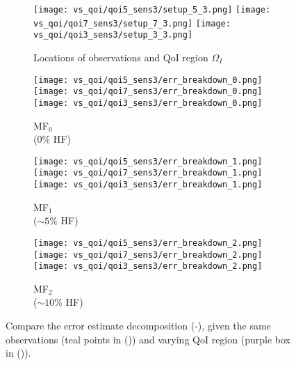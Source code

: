\begin{figure}[h]
\captionsetup[subfigure]{justification=centering}
\centering
  \begin{subfigure}[t]{0.20\textwidth}
  \centering
    \texttt{[image: vs\_qoi/qoi5\_sens3/setup\_5\_3.png]}
    \texttt{[image: vs\_qoi/qoi7\_sens3/setup\_7\_3.png]}
    \texttt{[image: vs\_qoi/qoi3\_sens3/setup\_3\_3.png]}
    \caption{Locations of observations and QoI region $\Omega_I$}
    \label{subfig:obsSetup}
  \end{subfigure}
  \begin{subfigure}[t]{0.20\textwidth}
  \centering
    \texttt{[image: vs\_qoi/qoi5\_sens3/err\_breakdown\_0.png]}
    \texttt{[image: vs\_qoi/qoi7\_sens3/err\_breakdown\_0.png]}
    \texttt{[image: vs\_qoi/qoi3\_sens3/err\_breakdown\_0.png]}
    \caption{MF$_0$ \\ ($0\%$ HF)}
    \label{subfig:obsLF}
  \end{subfigure}
  \begin{subfigure}[t]{0.20\textwidth}
  \centering
    \texttt{[image: vs\_qoi/qoi5\_sens3/err\_breakdown\_1.png]}
    \texttt{[image: vs\_qoi/qoi7\_sens3/err\_breakdown\_1.png]}
    \texttt{[image: vs\_qoi/qoi3\_sens3/err\_breakdown\_1.png]}
    \caption{MF$_1$ \\ ($\sim5\%$ HF)}
  \end{subfigure}
  \begin{subfigure}[t]{0.20\textwidth}
  \centering
    \texttt{[image: vs\_qoi/qoi5\_sens3/err\_breakdown\_2.png]}
    \texttt{[image: vs\_qoi/qoi7\_sens3/err\_breakdown\_2.png]}
    \texttt{[image: vs\_qoi/qoi3\_sens3/err\_breakdown\_2.png]}
    \caption{MF$_2$ \\ ($\sim10\%$ HF)}
    \label{subfig:obsMFlast}
  \end{subfigure}
  \caption{Compare the error estimate decomposition (-), given the same observations (teal points in ()) and varying QoI region (purple box in ()).}
  \label{fig:qoiStudy}
\end{figure}

